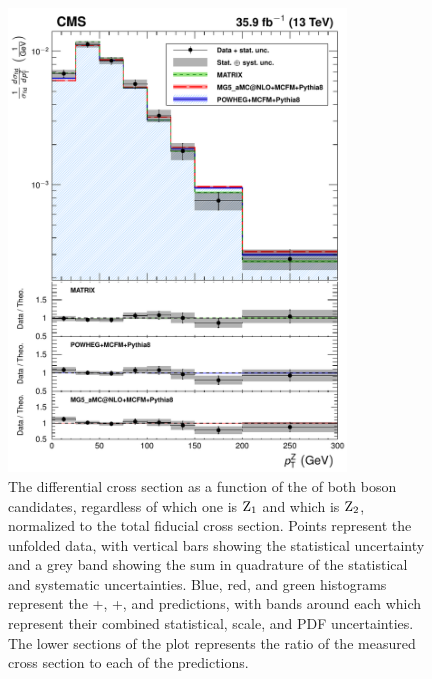 \begin{figure}[htbp]
  \begin{center}
    \includegraphics[width=0.8\textwidth]{results/unfold_zPt.pdf}
    \caption[Normalized differential {\ZZ} cross section as a function of {\PZ} boson candidate {\pt}]{
        The {\ZZ} differential cross section as a function of the {\pt} of both {\PZ} boson candidates, regardless of which one is $\mathrm{Z}_1$ and which is $\mathrm{Z}_2$, normalized to the total fiducial cross section.
        Points represent the unfolded data, with vertical bars showing the statistical uncertainty and a grey band showing the sum in quadrature of the statistical and systematic uncertainties.
        Blue, red, and green histograms represent the {\POWHEG}+{\MCFM}, {\MGAMC}+{\MCFM}, and {\MATRIX} predictions, with bands around each which represent their combined statistical, scale, and PDF uncertainties.
        The lower sections of the plot represents the ratio of the measured cross section to each of the predictions.
      }\label{fig:unfold_zPt}
  \end{center}
\end{figure}


